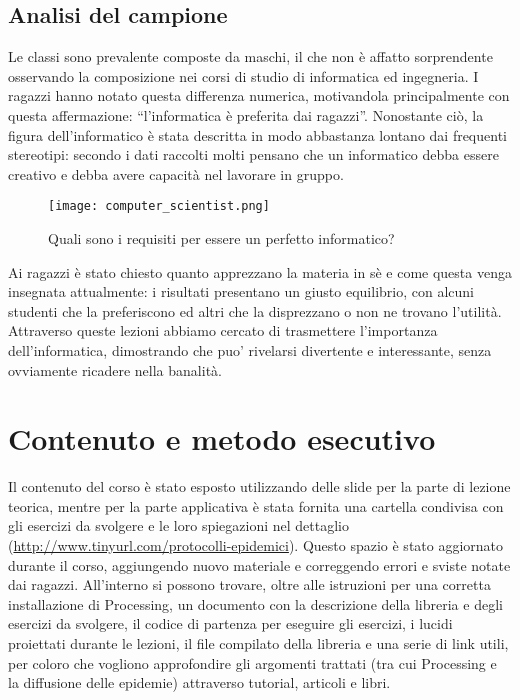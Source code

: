 \subsection{Analisi del campione}
Le classi sono prevalente composte da maschi, il che non è affatto sorprendente osservando la composizione nei corsi di studio di informatica ed ingegneria. I ragazzi hanno notato questa differenza numerica, motivandola principalmente con questa affermazione: “l'informatica è preferita dai ragazzi”. Nonostante ciò, la figura dell’informatico è stata descritta in modo abbastanza lontano dai frequenti stereotipi: secondo i dati raccolti molti pensano che un informatico debba essere creativo e debba avere capacità nel lavorare in gruppo.

\begin{figure}[!ht]
    \centering
    \texttt{[image: computer\_scientist.png]}
    \caption{Quali sono i requisiti per essere un perfetto informatico?}
    \label{fig:computer_scientist}
\end{figure}

Ai ragazzi è stato chiesto quanto apprezzano la materia in sè e come questa venga insegnata attualmente: i risultati presentano un giusto equilibrio, con alcuni studenti che la preferiscono ed altri che la disprezzano o non ne trovano l'utilità. Attraverso queste lezioni abbiamo cercato di trasmettere l'importanza dell'informatica, dimostrando che puo' rivelarsi divertente e interessante, senza ovviamente ricadere nella banalità.

\section{Contenuto e metodo esecutivo} 
Il contenuto del corso è stato esposto utilizzando delle slide per la parte di lezione teorica, mentre per la parte applicativa è stata fornita una cartella condivisa con gli esercizi da svolgere e le loro spiegazioni nel dettaglio (\href{http://www.tinyurl.com/protocolli-epidemici}{http://www.tinyurl.com/protocolli-epidemici}). Questo spazio è stato aggiornato durante il corso, aggiungendo nuovo materiale e correggendo errori e sviste notate dai ragazzi. All'interno si possono trovare, oltre alle istruzioni per una corretta installazione di Processing, un documento con la descrizione della libreria e degli esercizi da svolgere, il codice di partenza per eseguire gli esercizi, i lucidi proiettati durante le lezioni, il file compilato della libreria e una serie di link utili, per coloro che vogliono approfondire gli argomenti trattati (tra cui Processing e la diffusione delle epidemie) attraverso tutorial, articoli e libri. 

